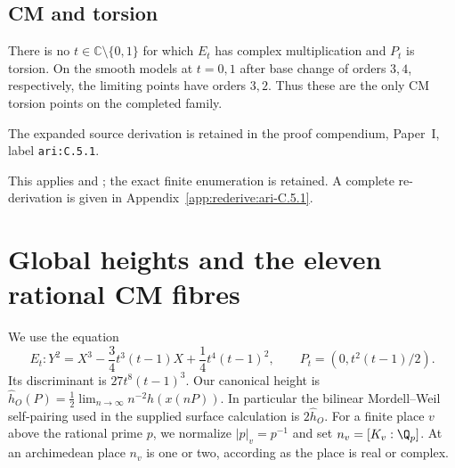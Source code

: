 \subsection{CM and torsion}
\begin{cited}\label{ari:C.5.1}

There is no $t\in\mathbb C\setminus\{0,1\}$ for which $E_t$ has
complex multiplication and $P_t$ is torsion. On the smooth models
at $t=0,1$ after base change of orders $3,4$, respectively, the
limiting points have orders $3,2$. Thus these are the only CM
torsion points on the completed family.
\end{cited}
The expanded source derivation is retained in the proof compendium, Paper~I, label \nolinkurl{ari:C.5.1}.




This applies \citet[Theorem~4.15]{BourdonClarkStankewicz2017} and \citet[Theorem~20.12 and Corollary~20.13]{Sutherland2023CM}; the exact finite enumeration is retained. A complete re-derivation is given in Appendix~\ref{app:rederive:ari-C.5.1}.



\section{Global heights and the eleven rational CM fibres}

We use the equation
\[
 E_t:Y^2=X^3-\frac34t^3(t-1)X+\frac14t^4(t-1)^2,
 \qquad P_t=(0,t^2(t-1)/2).
\]
Its discriminant is $27t^8(t-1)^3$. Our canonical height is
$\widehat h_O(P)=\frac12\lim_{n\to\infty}n^{-2}h(x(nP))$.
In particular the bilinear Mordell--Weil self-pairing used in the
supplied surface calculation is $2\widehat h_O$.
For a finite place $v$ above the rational prime $p$, we normalize
$|p|_v=p^{-1}$ and set $n_v=[K_v:\Q_p]$. At an archimedean
place $n_v$ is one or two, according as the place is real or complex.

